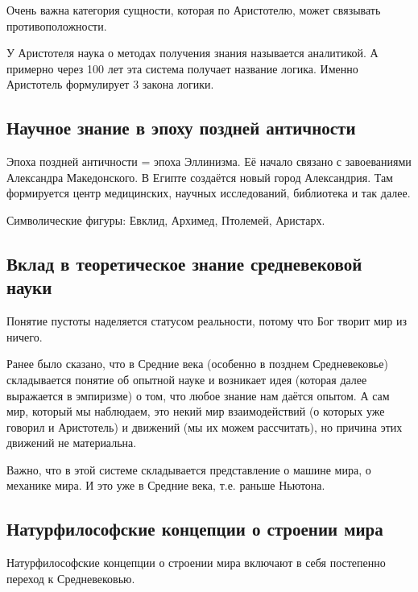 \documentclass[main.tex]{subfiles}
\begin{document}

Очень важна категория сущности, которая по Аристотелю, может связывать противоположности.

У Аристотеля наука о методах получения знания называется аналитикой.
А примерно через 100 лет эта система получает название логика.
Именно Аристотель формулирует 3 закона логики.

\subsection{Научное знание в эпоху поздней античности}


Эпоха поздней античности = эпоха Эллинизма.
Её начало связано с завоеваниями Александра Македонского.
В Египте создаётся новый город Александрия.
Там формируется центр медицинских, научных исследований, библиотека и так далее.

Символические фигуры: Евклид, Архимед, Птолемей, Аристарх.

\subsection{Вклад в теоретическое знание средневековой науки}


Понятие пустоты наделяется статусом реальности, потому что Бог творит мир из ничего.

Ранее было сказано, что в Средние века (особенно в позднем Средневековье) складывается понятие об опытной науке и возникает идея (которая далее выражается в эмпиризме) о том, что любое знание нам даётся опытом.
А сам мир, который мы наблюдаем, это некий мир взаимодействий (о которых уже говорил и Аристотель) и движений (мы их можем рассчитать), но причина этих движений не материальна.

Важно, что в этой системе складывается представление о машине мира, о механике мира.
И это уже в Средние века, т.е. раньше Ньютона.

\subsection{Натурфилософские концепции о строении мира}


Натурфилософские концепции о строении мира включают в себя постепенно переход к Средневековью.
\end{document}

